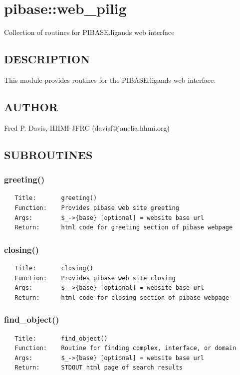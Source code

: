 \documentclass{article}
\begin{document}
\section{pibase::web\_pilig\label{pibase::web_pilig}}


Collection of routines for PIBASE.ligands web interface

\subsection*{DESCRIPTION\label{pibase::web_pilig_DESCRIPTION}}


This module provides routines for the PIBASE.ligands web interface.

\subsection*{AUTHOR\label{pibase::web_pilig_AUTHOR}}


Fred P. Davis, HHMI-JFRC (davisf@janelia.hhmi.org)

\subsection*{SUBROUTINES\label{pibase::web_pilig_SUBROUTINES}}
\subsubsection*{greeting()\label{pibase::web_pilig_greeting_}}
\begin{verbatim}
   Title:       greeting()
   Function:    Provides pibase web site greeting
   Args:        $_->{base} [optional] = website base url
   Return:      html code for greeting section of pibase webpage
\end{verbatim}
\subsubsection*{closing()\label{pibase::web_pilig_closing_}}
\begin{verbatim}
   Title:       closing()
   Function:    Provides pibase web site closing
   Args:        $_->{base} [optional] = website base url
   Return:      html code for closing section of pibase webpage
\end{verbatim}
\subsubsection*{find\_object()\label{pibase::web_pilig_find_object_}}
\begin{verbatim}
   Title:       find_object()
   Function:    Routine for finding complex, interface, or domain
   Args:        $_->{base} [optional] = website base url
   Return:      STDOUT html page of search results
\end{verbatim}
\end{document}
